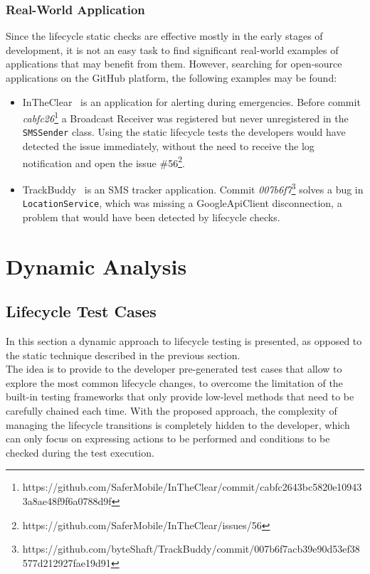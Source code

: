 \documentclass[11pt,a4paper,notitlepage]{article}
\begin{document}
\subsubsection{Real-World Application}
Since the lifecycle static checks are effective mostly in the early stages of development, it is not an easy task to find significant real-world examples of applications that may benefit from them. However, searching for open-source applications on the GitHub platform, the following examples may be found:
\begin{itemize}
	\item InTheClear~\cite{InTheClear} is an application for alerting during emergencies. Before commit \textit{cabfc26}\footnote{https://github.com/SaferMobile/InTheClear/commit/cabfc2643bc5820e109433a8ae48f9f6a0788d9f} a Broadcast Receiver was registered but never unregistered in the \texttt{SMSSender} class. Using the static lifecycle tests the developers would have detected the issue immediately, without the need to receive the log notification and open the issue \#56\footnote{https://github.com/SaferMobile/InTheClear/issues/56}.
	\item TrackBuddy~\cite{TrackBuddy} is an SMS tracker application. Commit \textit{007b6f7}\footnote{https://github.com/byteShaft/TrackBuddy/commit/007b6f7acb39e90d53ef38577d212927fae19d91} solves a bug in \texttt{LocationService}, which was missing a GoogleApiClient disconnection, a problem that would have been detected by lifecycle checks.
\end{itemize}

\section{Dynamic Analysis}\label{section_lifecycle_dynamic}

\subsection{Lifecycle Test Cases}
In this section a dynamic approach to lifecycle testing is presented, as opposed to the static technique described in the previous section.\medskip \\
The idea is to provide to the developer pre-generated test cases that allow to explore the most common lifecycle changes, to overcome the limitation of the built-in testing frameworks that only provide low-level methods that need to be carefully chained each time. With the proposed approach, the complexity of managing the lifecycle transitions is completely hidden to the developer, which can only focus on expressing actions to be performed and conditions to be checked during the test execution.
\end{document}
